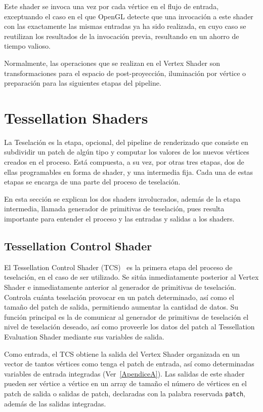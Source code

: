 Este shader se invoca una vez por cada vértice en el flujo de entrada,
exceptuando el caso en el que OpenGL detecte que una invocación a este shader
con las exactamente las mismas entradas ya ha sido realizada, en cuyo caso se
reutilizan los resultados de la invocación previa, resultando en un ahorro
de tiempo valioso. 

Normalmente, las operaciones que se realizan en el Vertex Shader son
transformaciones para el espacio de post-proyección, iluminación por vértice o
preparación para las siguientes etapas del pipeline. 

\section{Tessellation Shaders}
\label{ref:TesShaders}

La Teselación es la etapa, opcional, del pipeline de renderizado que consiste en
subdividir un patch de algún tipo y computar los valores de los nuevos vértices
creados en el proceso. Está compuesta, a su vez, por otras tres etapas, dos de
ellas programables en forma de shader, y una intermedia fija. Cada una de estas
etapas se encarga de una parte del proceso de teselación.

En esta sección se explican los dos shaders involucrados, además de la etapa
intermedia, llamada generador de primitivas de teselación, pues resulta
importante para entender el proceso y las entradas y salidas a los shaders.

\subsection{Tessellation Control Shader}
\label{ref:TesConShader}

El Tessellation Control Shader (TCS)~\cite{TesConShader} es la primera etapa del
proceso de teselación, en el caso de ser utilizado. Se sitúa inmediatamente
posterior al Vertex Shader e inmediatamente anterior al generador de primitivas
de teselación. Controla cuánta teselación provocar en un patch determinado, así
como el tamaño del patch de salida, permitiendo aumentar la cantidad de datos.
Su función principal es la de comunicar al generador de primitivas de teselación
el nivel de teselación deseado, así como proveerle los datos del patch al
Tessellation Evaluation Shader mediante sus variables de salida.

Como entrada, el TCS obtiene la salida del Vertex Shader organizada en un vector
de tantos vértices como tenga el patch de entrada, así como determinadas
variables de entrada integradas (Ver~\ref{ApendiceA}). Las salidas de este
shader pueden ser vértice a vértice en un array de tamaño el número de vértices
en el patch de salida o salidas de patch, declaradas con la palabra reservada
\verb|patch|, además de las salidas integradas.

